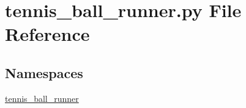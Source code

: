 \section{tennis\+\_\+ball\+\_\+runner.\+py File Reference}
\label{tennis__ball__runner_8py}
\subsection*{Namespaces}
\begin{DoxyCompactItemize}
\item 
 \hyperlink{namespacetennis__ball__runner}{tennis\+\_\+ball\+\_\+runner}
\end{DoxyCompactItemize}
